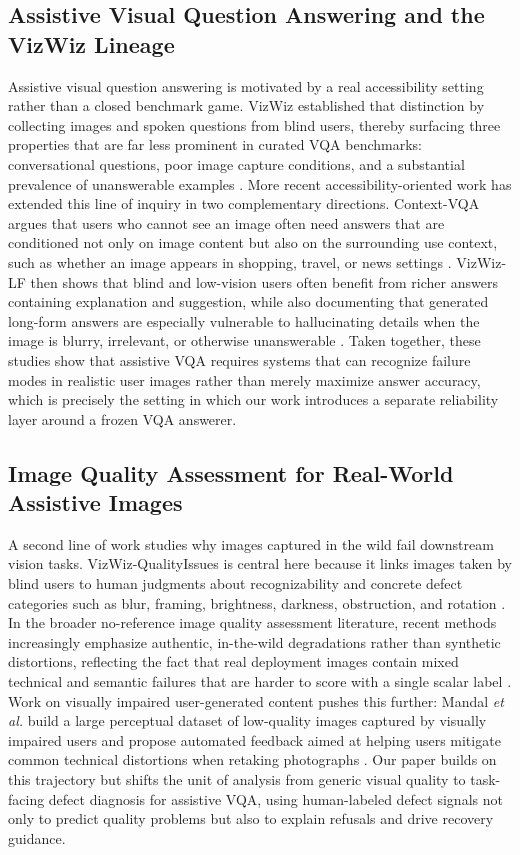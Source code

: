 \documentclass{ieeeaccess}
\begin{document}
\subsection{Assistive Visual Question Answering and the VizWiz Lineage}
Assistive visual question answering is motivated by a real accessibility setting rather than a closed benchmark game. VizWiz established that distinction by collecting images and spoken questions from blind users, thereby surfacing three properties that are far less prominent in curated VQA benchmarks: conversational questions, poor image capture conditions, and a substantial prevalence of unanswerable examples \cite{gurari2018vizwiz}. More recent accessibility-oriented work has extended this line of inquiry in two complementary directions. Context-VQA argues that users who cannot see an image often need answers that are conditioned not only on image content but also on the surrounding use context, such as whether an image appears in shopping, travel, or news settings \cite{naik2023contextvqa}. VizWiz-LF then shows that blind and low-vision users often benefit from richer answers containing explanation and suggestion, while also documenting that generated long-form answers are especially vulnerable to hallucinating details when the image is blurry, irrelevant, or otherwise unanswerable \cite{huh2024longform}. Taken together, these studies show that assistive VQA requires systems that can recognize failure modes in realistic user images rather than merely maximize answer accuracy, which is precisely the setting in which our work introduces a separate reliability layer around a frozen VQA answerer.

\subsection{Image Quality Assessment for Real-World Assistive Images}
A second line of work studies why images captured in the wild fail downstream vision tasks. VizWiz-QualityIssues is central here because it links images taken by blind users to human judgments about recognizability and concrete defect categories such as blur, framing, brightness, darkness, obstruction, and rotation \cite{chiu2020assessing}. In the broader no-reference image quality assessment literature, recent methods increasingly emphasize authentic, in-the-wild degradations rather than synthetic distortions, reflecting the fact that real deployment images contain mixed technical and semantic failures that are harder to score with a single scalar label \cite{sun2021blindquality}. Work on visually impaired user-generated content pushes this further: Mandal \emph{et al.} build a large perceptual dataset of low-quality images captured by visually impaired users and propose automated feedback aimed at helping users mitigate common technical distortions when retaking photographs \cite{mandal2023helping}. Our paper builds on this trajectory but shifts the unit of analysis from generic visual quality to task-facing defect diagnosis for assistive VQA, using human-labeled defect signals not only to predict quality problems but also to explain refusals and drive recovery guidance.
\end{document}
